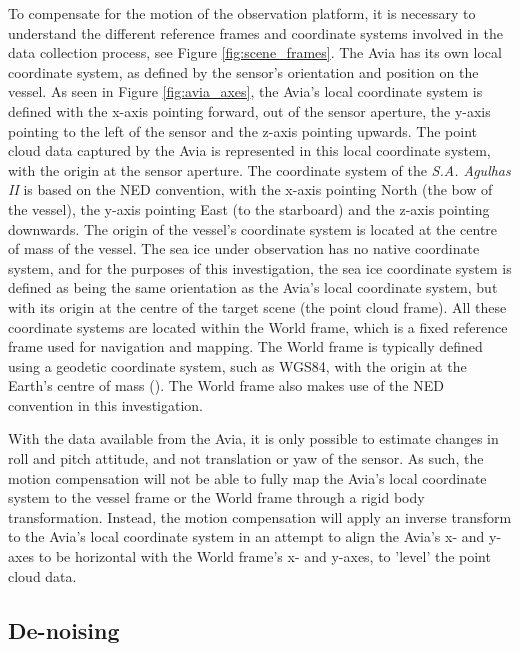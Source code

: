 To compensate for the motion of the observation platform, it is necessary to understand the different reference frames and coordinate systems involved in the data collection process, see Figure \ref{fig:scene_frames}. The Avia has its own local coordinate system, as defined by the sensor's orientation and position on the vessel. As seen in Figure \ref{fig:avia_axes}, the Avia's local coordinate system is defined with the x-axis pointing forward, out of the sensor aperture, the y-axis pointing to the left of the sensor and the z-axis pointing upwards. The point cloud data captured by the Avia is represented in this local coordinate system, with the origin at the sensor aperture. The coordinate system of the \textit{S.A. Agulhas II} is based on the \ac{NED} convention, with the x-axis pointing North (the bow of the vessel), the y-axis pointing East (to the starboard) and the z-axis pointing downwards. The origin of the vessel's coordinate system is located at the centre of mass of the vessel. The sea ice under observation has no native coordinate system, and for the purposes of this investigation, the sea ice coordinate system is defined as being the same orientation as the Avia's local coordinate system, but with its origin at the centre of the target scene (the point cloud frame). All these coordinate systems are located within the World frame, which is a fixed reference frame used for navigation and mapping. The World frame is typically defined using a geodetic coordinate system, such as WGS84, with the origin at the Earth's centre of mass (\cite{perezKinematicModelsManoeuvring2007}). The World frame also makes use of the \ac{NED} convention in this investigation.

With the data available from the Avia, it is only possible to estimate changes in roll and pitch attitude, and not translation or yaw of the sensor. As such, the motion compensation will not be able to fully map the Avia's local coordinate system to the vessel frame or the World frame through a rigid body transformation. Instead, the motion compensation will apply an inverse transform to the Avia's local coordinate system in an attempt to align the Avia's x- and y-axes to be horizontal with the World frame's x- and y-axes, to 'level' the point cloud data. 

\subsection{De-noising}
\label{subsec:ch6.section1.subsec2}

